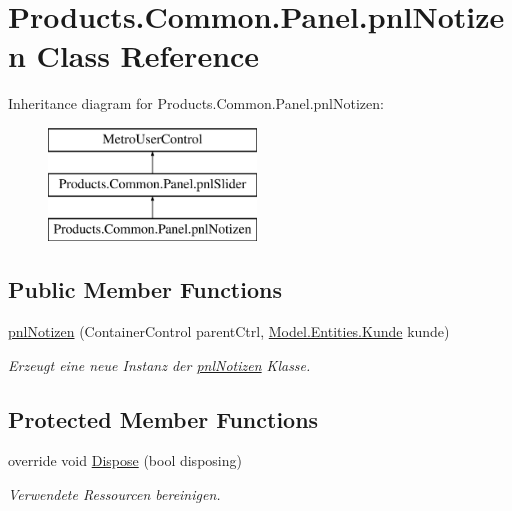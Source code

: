 \hypertarget{class_products_1_1_common_1_1_panel_1_1pnl_notizen}{}\section{Products.\+Common.\+Panel.\+pnl\+Notizen Class Reference}
\label{class_products_1_1_common_1_1_panel_1_1pnl_notizen}
Inheritance diagram for Products.\+Common.\+Panel.\+pnl\+Notizen\+:\begin{figure}[H]
\begin{center}
\leavevmode
\includegraphics[height=3.000000cm]{class_products_1_1_common_1_1_panel_1_1pnl_notizen}
\end{center}
\end{figure}
\subsection*{Public Member Functions}
\begin{DoxyCompactItemize}
\item 
\hyperlink{class_products_1_1_common_1_1_panel_1_1pnl_notizen_abc00f63f18dde96f3402d91ec3c63bf7}{pnl\+Notizen} (Container\+Control parent\+Ctrl, \hyperlink{class_products_1_1_model_1_1_entities_1_1_kunde}{Model.\+Entities.\+Kunde} kunde)
\begin{DoxyCompactList}\small\item\em Erzeugt eine neue Instanz der \hyperlink{class_products_1_1_common_1_1_panel_1_1pnl_notizen}{pnl\+Notizen} Klasse. \end{DoxyCompactList}\end{DoxyCompactItemize}
\subsection*{Protected Member Functions}
\begin{DoxyCompactItemize}
\item 
override void \hyperlink{class_products_1_1_common_1_1_panel_1_1pnl_notizen_a25ac257060a31f5121ace9706fc32f90}{Dispose} (bool disposing)
\begin{DoxyCompactList}\small\item\em Verwendete Ressourcen bereinigen. \end{DoxyCompactList}\end{DoxyCompactItemize}
